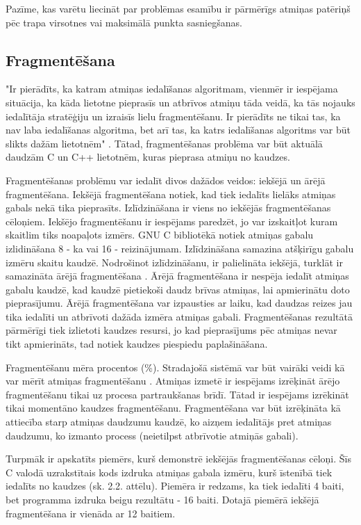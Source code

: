 Pazīme, kas varētu liecināt par problēmas esamību ir pārmērīgs atmiņas patēriņš pēc trapa virsotnes vai maksimālā punkta sasniegšanas.

\subsection{Fragmentēšana}

"Ir pierādīts, ka katram atmiņas iedalīšanas algoritmam, vienmēr ir iespējama situācija, ka kāda lietotne pieprasīs 
un atbrīvos atmiņu tāda veidā, ka tās nojauks iedalītāja stratēģiju un izraisīs lielu fragmentēšanu. 
Ir pierādīts ne tikai tas, ka nav laba iedalīšanas algoritma, bet arī tas, ka katrs iedalīšanas algoritms var būt slikts dažām lietotnēm" \cite{PWMS}.
Tātad, fragmentēšanas problēma var būt aktuālā daudzām C un C++ lietotnēm, kuras pieprasa atmiņu no kaudzes.

Fragmentēšanas problēmu var iedalīt divos dažādos veidos: iekšējā un ārējā fragmentēšana.
Iekšējā fragmentēšana notiek, kad tiek iedalīts lielāks atmiņas gabals nekā tika pieprasīts.
Izlīdzināšana ir viens no iekšējās fragmentēšanas cēloņiem.
Iekšējo fragmentēšanu ir iespējams paredzēt, jo var izskaitļot kuram skaitlim tiks noapaļots izmērs.
GNU C bibliotēkā notiek atmiņas gabalu izlidināšana 8 - ka vai 16 - reizinājumam.
Izlīdzināšana samazina atšķirīgu gabalu izmēru skaitu kaudzē.
Nodrošinot izlīdzināšanu, ir palielināta iekšējā, turklāt ir samazināta ārējā fragmentēšana \cite{RAN}.
Ārējā fragmentēšana ir nespēja iedalīt atmiņas gabalu kaudzē, kad kaudzē pietiekoši daudz brīvas atmiņas, lai apmierinātu doto pieprasījumu.
Ārējā fragmentēšana var izpausties ar laiku, kad daudzas reizes jau tika iedalīti un atbrīvoti dažāda izmēra atmiņas gabali.
Fragmentēšanas rezultātā pārmērīgi tiek izlietoti kaudzes resursi, jo kad pieprasījums pēc atmiņas nevar tikt apmierināts, tad notiek kaudzes piespiedu paplašināšana.

Fragmentēšanu mēra procentos (\%). 
Stradajošā sistēmā var būt vairāki veidi kā var mērīt atmiņas fragmentēšanu \cite{MSJ}. 
Atmiņas izmetē ir iespējams izrēķināt ārējo fragmentēšanu tikai uz procesa partraukšanas brīdī.
Tātad ir iespējams izrēkināt tikai momentāno kaudzes fragmentēšanu.
Fragmentēšana var būt izrēķināta kā attiecība starp atmiņas daudzumu kaudzē, ko aizņem iedalītājs pret atmiņas daudzumu, ko izmanto process (neietilpst atbrīvotie atmiņās gabali).

Turpmāk ir apskatīts piemērs, kurš demonstrē iekšējās fragmentēšanas cēloņi.
Šīs C valodā uzrakstītais kods izdruka atmiņas gabala izmēru, kurš īstenībā tiek iedalīts no kaudzes (sk. 2.2. attēlu).
Piemēra ir redzams, ka tiek iedalīti 4 baiti, bet programma izdruka beigu rezultātu - 16 baiti.
Dotajā piemērā iekšējā fragmentēšana ir vienāda ar 12 baitiem.

